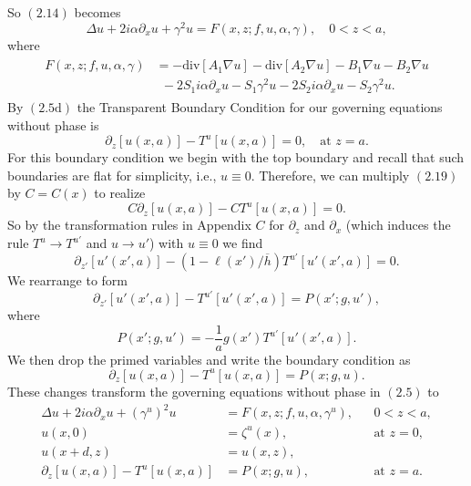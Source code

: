 So $(2.14)$ becomes
\begin{equation}\Delta u +2i\alpha\partial_xu+\gamma^2u=F(x,z;f,u,\alpha,\gamma),\quad \text{$0<z<a$}, \end{equation}
where
\begin{align}
\begin{split}
F(x,z;f,u,\alpha,\gamma)&=-\text{div}[A_1\nabla u]-\text{div}[A_2\nabla u]-B_1\nabla u - B_2\nabla u \\&~~-2S_1i\alpha\partial_xu-S_1\gamma^2u-2S_2i\alpha\partial_xu-S_2\gamma^2u.
\end{split}
\end{align}
By $(2.5\text{d})$ the Transparent Boundary Condition for our governing equations without phase is
\begin{equation}\partial_z \left[u(x,a)\right] - T^u[u(x,a)]=0,\quad \text{at $z=a$}. \end{equation}
For this boundary condition we begin with the top boundary and recall that such boundaries are flat for simplicity, i.e., $u\equiv 0$. Therefore, we can multiply $(2.19)$ by $C=C(x)$ to realize
$$C\partial_{z} \left[u(x,a)\right] - CT^u[u(x,a)]=0.$$
So by the transformation rules in Appendix $C$ for $\partial_z$ and $\partial_x$ (which induces the rule $T^u\to T^{u'}$ and $u \to u'$) with $u\equiv 0$ we find
$$\partial_{z'} \left[u'(x',a)\right] - (1-\ell(x')/ \overline{h})T^{u'}[u'(x',a)]=0.$$
We rearrange to form
$$\partial_{z'} \left[u'(x',a)\right] - T^{u'}[u'(x',a)]=P(x';g,u'),$$
where
$$P(x';g,u')=-\frac{1}{a}g(x')T^{u'}\left[u'(x',a)\right].$$
We then drop the primed variables and write the boundary condition as
$$\partial_z \left[u(x,a)\right] - T^u[u(x,a)]=P(x;g,u).$$
These changes transform the governing equations without phase in $(2.5)$ to
\vspace{-1.5mm}
\begin{subequations}
\begin{align}
\Delta u +2i\alpha\partial_xu+(\gamma^u)^2u&=F\left(x,z;f,u,\alpha,\gamma^u\right), &&\text{$0<z<a$}, \\
u(x,0)&=\zeta^u(x), &&\text{at $z=0$},\\
u(x+d,z)&=u(x,z), \\
\partial_z \left[u(x,a)\right] - T^u[u(x,a)]&=P(x;g,u), &&\text{at $z=a$}.
\end{align}
\end{subequations}
